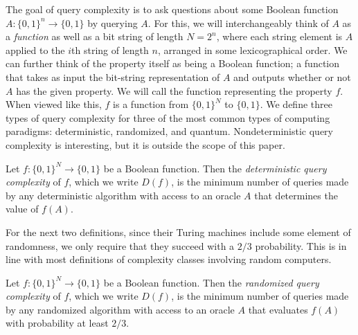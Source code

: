 The goal of query complexity is to ask questions about some Boolean function
$A: \{0, 1\}^{n} \rightarrow \{0, 1\}$ by querying $A$. For this, we will interchangeably
think of $A$ as a \emph{function} as well as a bit string of length $N = 2^{n}$,
where each string element is $A$ applied to the $i$th string of length $n$,
arranged in some lexicographical order. %
We can further think of the property itself as being a Boolean function; a
function that takes as input the bit-string representation of $A$ and outputs
whether or not $A$ has the given property. We will call the function
representing the property $f$. When viewed like this, $f$ is a function from
$\{0, 1\}^{N}$ to $\{0, 1\}$. We define three types of query complexity for
three of the most common types of computing paradigms: deterministic,
randomized, and quantum. Nondeterministic query complexity is interesting, but
it is outside the scope of this paper.

\begin{defn}[{\cite[17]{AW09}}]\label{def:det-qc}
  Let $f: \{0, 1\}^{N} \rightarrow \{0, 1\}$ be a Boolean function. Then the
  \emph{deterministic query complexity} of $f$, which we write $D(f)$, is the
  minimum number of queries made by any deterministic algorithm with access to
  an oracle $A$ that determines the value of $f(A)$.
\end{defn}

For the next two definitions, since their Turing machines include some element
of randomness, we only require that they succeed with a $2/3$ probability. This
is in line with most definitions of complexity classes involving random
computers.

\begin{defn}[{\cite[17]{AW09}}]\label{def:rand-qc}
  Let $f: \{0, 1\}^{N} \rightarrow \{0, 1\}$ be a Boolean function. Then the
  \emph{randomized query complexity} of $f$, which we write $D(f)$, is the
  minimum number of queries made by any randomized algorithm with access to an
  oracle $A$ that evaluates $f(A)$ with probability at least $2/3$.
\end{defn}


